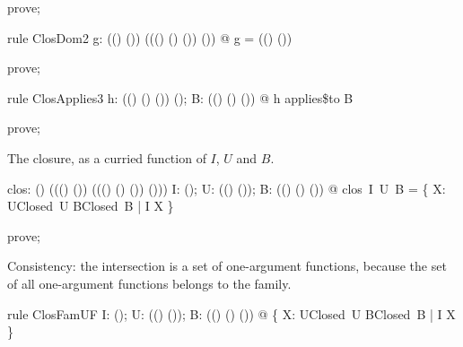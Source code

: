 \documentclass{article}
\begin{document}
\begin{zproof}
prove;
\end{zproof}

\begin{theorem}{rule ClosDom2}
  \forall g: \power ((\nat \fun \nat) \fun (\nat \fun \nat)) \fun (\power ((\nat \fun \nat) \cross (\nat \fun \nat) \fun (\nat \fun \nat)) \fun \power (\nat \fun \nat)) @ \dom g = \power ((\nat \fun \nat) \fun (\nat \fun \nat))
\end{theorem}

\begin{zproof}
prove;
\end{zproof}

\begin{theorem}{rule ClosApplies3}
  \forall h: \power ((\nat \fun \nat) \cross (\nat \fun \nat) \fun (\nat \fun \nat)) \fun \power (\nat \fun \nat); B: \power ((\nat \fun \nat) \cross (\nat \fun \nat) \fun (\nat \fun \nat)) @ h applies\$to B
\end{theorem}

\begin{zproof}
prove;
\end{zproof}

The closure, as a curried function of $I$, $U$ and $B$.

\begin{axdef}
  clos: \power (\nat \fun \nat) \fun (\power ((\nat \fun \nat) \fun (\nat \fun \nat)) \fun (\power ((\nat \fun \nat) \cross (\nat \fun \nat) \fun (\nat \fun \nat)) \fun \power (\nat \fun \nat)))
\where
   \forall I: \power (\nat \fun \nat); U: \power ((\nat \fun \nat) \fun (\nat \fun \nat)); B: \power ((\nat \fun \nat) \cross (\nat \fun \nat) \fun (\nat \fun \nat)) @ clos~I~U~B = \bigcap \{ X: UClosed~U \cap BClosed~B | I \subseteq X \}
\end{axdef}

\begin{zproof}
prove;
\end{zproof}

Consistency: the intersection is a set of one-argument functions, because the set of all
one-argument functions belongs to the family.

\begin{theorem}{rule ClosFamUF}
  \forall I: \power (\nat \fun \nat); U: \power ((\nat \fun \nat) \fun (\nat \fun \nat)); B: \power ((\nat \fun \nat) \cross (\nat \fun \nat) \fun (\nat \fun \nat)) @
    \nat \fun \nat \in \{ X: UClosed~U \cap BClosed~B | I \subseteq X \}
\end{theorem}
\end{document}
